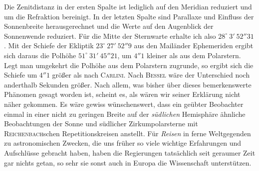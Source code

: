 \par\indent Die Zenitdistanz in der ersten Spalte ist lediglich auf den Meridian reduziert und um die Refraktion bereinigt. In der letzten Spalte sind Parallaxe und Einfluss der Sonnenbreite herausgerechnet und die Werte auf den Augenblick der Sonnenwende reduziert. Für die Mitte der Sternwarte erhalte ich also $28^\circ\ 3'\ 52''31$. Mit der Schiefe der Ekliptik $23^\circ\ 27'\ 52''9$ aus den Mailänder Ephemeriden ergibt sich daraus die Polhöhe $51^\circ\ 31'\ 45''21$, um $4''1$ kleiner als aus dem Polarstern. Legt man umgekehrt die Polhöhe aus dem Polarstern zugrunde, so ergibt sich die Schiefe um $4''1$ größer als nach \textsc{Carlini}. Nach \textsc{Bessel} wäre der Unterschied noch anderthalb Sekunden größer. Nach allem, was bisher über dieses bemerkenswerte Phänomen gesagt worden ist, scheint es, als wären wir seiner Erklärung nicht näher gekommen. Es wäre gewiss wünschenswert, dass ein geübter Beobachter einmal in einer nicht zu geringen Breite auf der \emph{südlichen} Hemisphäre ähnliche Beobachtungen der Sonne und südlicher Zirkumpolarsterne mit \textsc{Reichenbach}schen Repetitionskreisen anstellt. Für \emph{Reisen} in ferne Weltgegenden zu astronomischen Zwecken, die uns früher so viele wichtige Erfahrungen und Aufschlüsse gebracht haben, haben die Regierungen tatsächlich seit geraumer Zeit gar nichts getan, so sehr sie sonst auch in Europa die Wissenschaft unterstützen.

